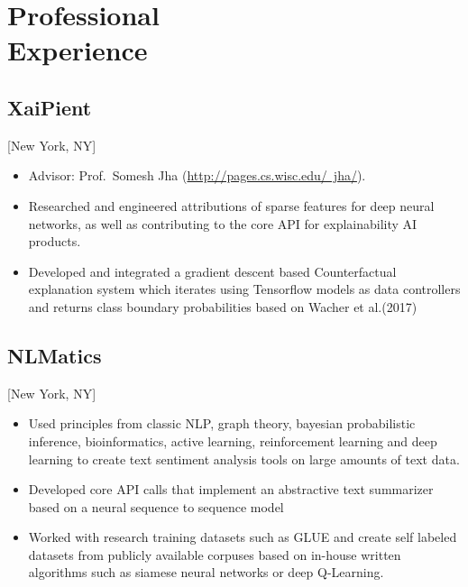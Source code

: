 \documentclass{rkim-resume}
\begin{document}
\maketitle%

\section{Professional \\ Experience}

\subsection{XaiPient}[New York, NY]
\begin{positions}
\end{positions}

\begin{itemize}
  \item Advisor: Prof.~Somesh Jha (\href{http://pages.cs.wisc.edu/~jha/}{http://pages.cs.wisc.edu/~jha/}).
  \item Researched and engineered attributions of sparse features for deep neural networks, as well as contributing to the core API for explainability AI products.
  \item Developed and integrated a gradient descent based Counterfactual explanation system which iterates using Tensorflow models as data controllers and returns class boundary probabilities based on Wacher et al.(2017)
\end{itemize}

\subsection{NLMatics}[New York, NY]
\begin{positions}
\end{positions}

\begin{itemize}
  \item Used principles from classic NLP, graph theory, bayesian probabilistic inference, bioinformatics, active learning, reinforcement learning and deep
learning to create text sentiment analysis tools on large amounts of text data.
  \item Developed core API calls that implement an abstractive text summarizer based on a neural sequence to sequence model
  \item Worked with research training datasets such as GLUE and create self labeled datasets from publicly available corpuses based on in-house written algorithms such as siamese neural networks or deep Q-Learning.
\end{itemize}
\end{document}
